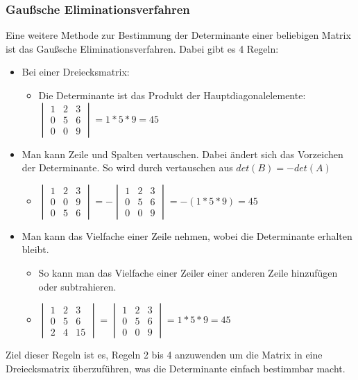 \documentclass{article}
\begin{document}
	\subsubsection{Gaußsche Eliminationsverfahren}
	Eine weitere Methode zur Bestimmung der Determinante einer beliebigen Matrix ist das Gaußsche Eliminationsverfahren. Dabei gibt es 4 Regeln:
	\begin{itemize}
		\item{Bei einer Dreiecksmatrix:}
		\begin{itemize}
			\item{Die Determinante ist das Produkt der Hauptdiagonalelemente: $\begin{vmatrix} 1 & 2 & 3 \\ 0 & 5 & 6 \\ 0 & 0 & 9 \end{vmatrix}=1*5*9=45$}
		\end{itemize}
		\item{Man kann Zeile und Spalten vertauschen. Dabei ändert sich das Vorzeichen der Determinante. So wird durch vertauschen aus $det(B)=-det(A)$}
		\begin{itemize}
			\item{$\begin{vmatrix} 1 & 2 & 3 \\ 0 & 0 & 9 \\ 0 & 5 & 6 \end{vmatrix}=-\begin{vmatrix} 1 & 2 & 3 \\ 0 & 5 & 6 \\ 0 & 0 & 9 \end{vmatrix}=-(1*5*9)=45$}
		\end{itemize}
		\item{Man kann das Vielfache einer Zeile nehmen, wobei die Determinante erhalten bleibt.}
		\begin{itemize}
			\item{So kann man das Vielfache einer Zeiler einer anderen Zeile hinzufügen oder subtrahieren.}
			\item{$\begin{vmatrix} 1 & 2 & 3 \\ 0 & 5 & 6 \\ 2 & 4 & 15 \end{vmatrix}=\begin{vmatrix} 1 & 2 & 3 \\ 0 & 5 & 6 \\ 0 & 0 & 9 \end{vmatrix}=1*5*9=45$}
		\end{itemize}
	\end{itemize}
	Ziel dieser Regeln ist es, Regeln 2 bis 4 anzuwenden um die Matrix in eine Dreiecksmatrix überzuführen, was die Determinante einfach bestimmbar macht.
\end{document}

